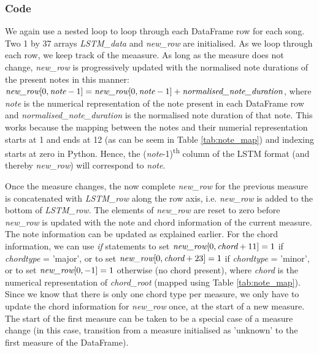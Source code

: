 \subsubsection{Code}
We again use a nested loop to loop through each DataFrame row for each song. Two 1 by 37 arrays \emph{LSTM\_data} and \emph{new\_row} are initialised. As we loop through each row, we keep track of the meaasure. As long as the measure does not change, \emph{new\_row} is progressively updated with the normalised note durations of the present notes in this manner: $\emph{new\_row}[0,\emph{note}-1] = \emph{new\_row}[0,\emph{note}-1] + \emph{normalised\_note\_duration}$, where \emph{note} is the numerical representation of the note present in each DataFrame row and \emph{normalised\_note\_duration} is the normalised note duration of that note. This works because the mapping between the notes and their numerial representation starts at 1 and ends at 12 (as can be seem in Table \ref{tab:note_map}) and indexing starts at zero in Python. Hence, the (\emph{note}-1)\textsuperscript{th} column of the LSTM format (and thereby \emph{new\_row}) will correspond to \emph{note}.

Once the measure changes, the now complete \emph{new\_row} for the previous measure is concatenated with \emph{LSTM\_row} along the row axis, i.e. \emph{new\_row} is added to the bottom of \emph{LSTM\_row}. The elements of \emph{new\_row} are reset to zero before \emph{new\_row} is updated with the note and chord information of the current measure. The note information can be updated as explained earlier. For the chord information, we can use \emph{if} statements to set $\emph{new\_row}[0, \emph{chord}+11] = 1$ if \emph{chordtype} = 'major', or to set $\emph{new\_row}[0, \emph{chord}+23] = 1$ if \emph{chordtype} = 'minor', or to set $\emph{new\_row}[0, -1] = 1$ otherwise (no chord present), where \emph{chord} is the numerical representation of \emph{chord\_root} (mapped using Table \ref{tab:note_map}). Since we know that there is only one chord type per measure, we only have to update the chord information for \emph{new\_row} once, at the start of a new measure. The start of the first measure can be taken to be a special case of a measure change (in this case, transition from a measure initialised as 'unknown' to the first measure of the DataFrame).

